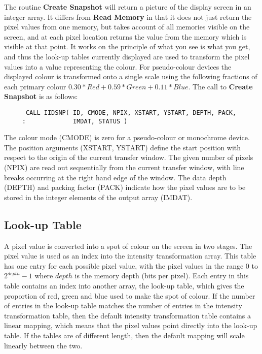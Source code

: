 The routine {\bf Create Snapshot} will return a picture of the display
screen in an integer array. It differs from {\bf Read Memory} in that it
does not just return the pixel values from one memory, but takes account
of all memories visible on the screen, and at each pixel location returns
the value from the memory which is visible at that point. It works on the
principle of what you see is what you get, and thus the look-up tables
currently displayed are used to transform the pixel values into a value
representing the colour. For pseudo-colour devices the displayed colour
is transformed onto a single scale using the following fractions of each
primary colour $ 0.30 * Red + 0.59 * Green + 0.11 * Blue $.
The call to {\bf Create Snapshot} is as follows:
\begin{small}
\begin{verbatim}
      CALL IIDSNP( ID, CMODE, NPIX, XSTART, YSTART, DEPTH, PACK,
     :             IMDAT, STATUS )
\end{verbatim}
\end{small}
The colour mode (CMODE) is zero for a pseudo-colour or monochrome device.
The position arguments (XSTART, YSTART) define the start position
with respect to the origin of the current transfer window.
The given number of pixels (NPIX) are read out sequentially
from the current transfer window, with line breaks occurring at the
right hand edge of the window.
The data depth (DEPTH) and packing factor (PACK) indicate how
the pixel values are to be stored in the integer elements of the output
array (IMDAT).

\subsection{Look-up Table}

A pixel value is converted into a spot of colour on the screen in two
stages. The pixel value is used as an index into the intensity
transformation array. This table has one entry for each possible
pixel value, with the pixel values in the range 0 to $2^{depth}-1$
where $depth$ is the memory depth (bits per pixel). Each entry in
this table contains an index into another array, the look-up table,
which gives the proportion of red, green and blue used to make the
spot of colour. If the number of entries in the look-up table matches
the number of entries in the intensity transformation table, then the
default intensity transformation table contains a linear mapping, which
means that the pixel values point directly into the look-up table. If the
tables are of different length, then the default mapping will scale
linearly between the two.

